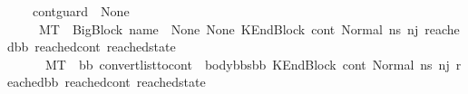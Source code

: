 \begin{isabellebody}
\ \ \ \ {\isacharparenleft}{\kern0pt}{\isacharparenleft}{\kern0pt}cont{\isacharunderscore}{\kern0pt}guard\ {\isacharequal}{\kern0pt}\ None{\isacharparenright}{\kern0pt}\ {\isasymand}\ \isanewline
\ \ \ \ \ {\isacharparenleft}{\kern0pt}{\isacharparenleft}{\kern0pt}M{\isacharcomma}{\kern0pt}{\isasymLambda}{\isacharcomma}{\kern0pt}{\isasymGamma}{\isacharcomma}{\kern0pt}{\isasymOmega}{\isacharcomma}{\kern0pt}T\ {\isasymturnstile}\ {\isacharparenleft}{\kern0pt}{\isacharparenleft}{\kern0pt}BigBlock\ name\ {\isacharbrackleft}{\kern0pt}{\isacharbrackright}{\kern0pt}\ None\ None{\isacharparenright}{\kern0pt}{\isacharcomma}{\kern0pt}\ KEndBlock\ cont{}{\isacharcomma}{\kern0pt}\ {\isacharparenleft}{\kern0pt}Normal\ ns{}{\isacharprime}{\kern0pt}{\isacharprime}{\kern0pt}{\isacharparenright}{\kern0pt}{\isacharparenright}{\kern0pt}\ {\isacharminus}{\kern0pt}n{\isasymlongrightarrow}{\isacharcircum}{\kern0pt}j{\isacharprime}{\kern0pt}\ {\isacharparenleft}{\kern0pt}reached{\isacharunderscore}{\kern0pt}bb{\isacharcomma}{\kern0pt}\ reached{\isacharunderscore}{\kern0pt}cont{\isacharcomma}{\kern0pt}\ reached{\isacharunderscore}{\kern0pt}state{\isacharparenright}{\kern0pt}{\isacharparenright}{\kern0pt}\ {\isasymor}\isanewline
\ \ \ \ \ \ {\isacharparenleft}{\kern0pt}M{\isacharcomma}{\kern0pt}{\isasymLambda}{\isacharcomma}{\kern0pt}{\isasymGamma}{\isacharcomma}{\kern0pt}{\isasymOmega}{\isacharcomma}{\kern0pt}T\ {\isasymturnstile}\ {\isacharparenleft}{\kern0pt}bb{}{\isacharcomma}{\kern0pt}\ convert{\isacharunderscore}{\kern0pt}list{\isacharunderscore}{\kern0pt}to{\isacharunderscore}{\kern0pt}cont\ {\isacharparenleft}{\kern0pt}{\isacharparenleft}{\kern0pt}\ body{\isacharunderscore}{\kern0pt}bbs{\isacharparenright}{\kern0pt}{\isacharat}{\kern0pt}{\isacharbrackleft}{\kern0pt}bb{\isacharbrackright}{\kern0pt}{\isacharparenright}{\kern0pt}\ {\isacharparenleft}{\kern0pt}KEndBlock\ cont{}{\isacharparenright}{\kern0pt}{\isacharcomma}{\kern0pt}\ {\isacharparenleft}{\kern0pt}Normal\ ns{}{\isacharprime}{\kern0pt}{\isacharprime}{\kern0pt}{\isacharparenright}{\kern0pt}{\isacharparenright}{\kern0pt}\ {\isacharminus}{\kern0pt}n{\isasymlongrightarrow}{\isacharcircum}{\kern0pt}j{\isacharprime}{\kern0pt}\ {\isacharparenleft}{\kern0pt}reached{\isacharunderscore}{\kern0pt}bb{\isacharcomma}{\kern0pt}\ reached{\isacharunderscore}{\kern0pt}cont{\isacharcomma}{\kern0pt}\ reached{\isacharunderscore}{\kern0pt}state{\isacharparenright}{\kern0pt}{\isacharparenright}{\kern0pt}{\isacharparenright}{\kern0pt}{\isacharparenright}{\kern0pt}\ \ {\isasymLongrightarrow}\ \ \isanewline

\end{isabellebody}
